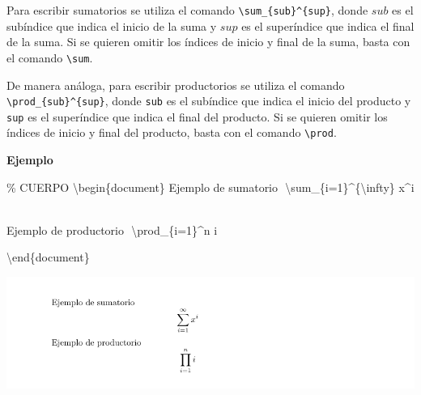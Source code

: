 \documentclass[
  letterpaper,
  DIV=11,
  numbers=noendperiod]{scrreport}
\newenvironment{Shaded}{\begin{snugshade}}{\end{snugshade}}
\newcommand{\CommentTok}[1]{\textcolor[rgb]{0.37,0.37,0.37}{#1}}
\newcommand{\ExtensionTok}[1]{\textcolor[rgb]{0.00,0.23,0.31}{#1}}
\newcommand{\KeywordTok}[1]{\textcolor[rgb]{0.00,0.23,0.31}{#1}}
\newcommand{\NormalTok}[1]{\textcolor[rgb]{0.00,0.23,0.31}{#1}}
\newcommand{\SpecialCharTok}[1]{\textcolor[rgb]{0.37,0.37,0.37}{#1}}
\newcommand{\SpecialStringTok}[1]{\textcolor[rgb]{0.13,0.47,0.30}{#1}}
\begin{document}
Para escribir sumatorios se utiliza el comando
\texttt{\textbackslash{}sum\_\{sub\}\^{}\{sup\}}, donde \(sub\) es el
subíndice que indica el inicio de la suma y \(sup\) es el superíndice
que indica el final de la suma. Si se quieren omitir los índices de
inicio y final de la suma, basta con el comando
\texttt{\textbackslash{}sum}.

De manera análoga, para escribir productorios se utiliza el comando
\texttt{\textbackslash{}prod\_\{sub\}\^{}\{sup\}}, donde \texttt{sub} es
el subíndice que indica el inicio del producto y \texttt{sup} es el
superíndice que indica el final del producto. Si se quieren omitir los
índices de inicio y final del producto, basta con el comando
\texttt{\textbackslash{}prod}.

\textbf{Ejemplo}

\begin{Shaded}
\begin{Highlighting}[]
\CommentTok{\% CUERPO}
\KeywordTok{\textbackslash{}begin}\NormalTok{\{}\ExtensionTok{document}\NormalTok{\}}
\NormalTok{Ejemplo de sumatorio}
\SpecialStringTok{$$}
\SpecialCharTok{\textbackslash{}sum}\SpecialStringTok{\_\{i=1\}\^{}\{}\SpecialCharTok{\textbackslash{}infty}\SpecialStringTok{\} x\^{}i}
\SpecialStringTok{$$}




\NormalTok{Ejemplo de productorio}
\SpecialStringTok{$$}
\SpecialCharTok{\textbackslash{}prod}\SpecialStringTok{\_\{i=1\}\^{}n i}
\SpecialStringTok{$$}



\KeywordTok{\textbackslash{}end}\NormalTok{\{}\ExtensionTok{document}\NormalTok{\}}
\end{Highlighting}
\end{Shaded}

\begin{tcolorbox}[enhanced jigsaw, opacitybacktitle=0.6, coltitle=black, colbacktitle=quarto-callout-note-color!10!white, title={Salida}, colback=white, toprule=.15mm, breakable, opacityback=0, left=2mm, rightrule=.15mm, toptitle=1mm, colframe=quarto-callout-note-color-frame, bottomtitle=1mm, titlerule=0mm, arc=.35mm, bottomrule=.15mm, leftrule=.75mm]
\includegraphics{./img/formulas/sumatorio.png}
\end{tcolorbox}
\end{document}
